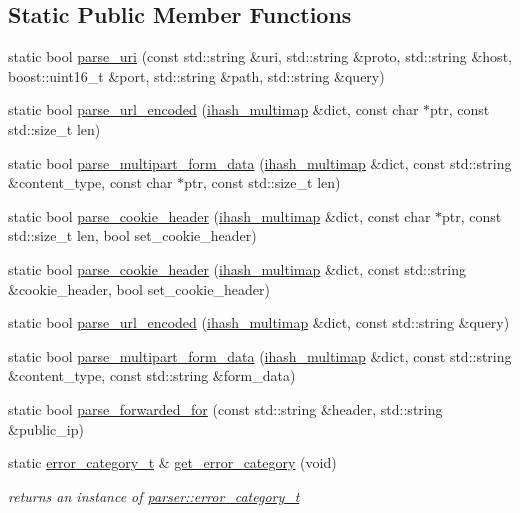 \subsection*{Static Public Member Functions}
\begin{DoxyCompactItemize}
\item 
static bool \hyperlink{classpion_1_1http_1_1parser_a0688e577644445e854e6e9c1d614fd25}{parse\-\_\-uri} (const std\-::string \&uri, std\-::string \&proto, std\-::string \&host, boost\-::uint16\-\_\-t \&port, std\-::string \&path, std\-::string \&query)
\item 
static bool \hyperlink{classpion_1_1http_1_1parser_a3cda26a67405acd5ba04ee19bca52ea7}{parse\-\_\-url\-\_\-encoded} (\hyperlink{namespacepion_a2cd31d7bbe0e98008bd4e6f135103c0e}{ihash\-\_\-multimap} \&dict, const char $\ast$ptr, const std\-::size\-\_\-t len)
\item 
static bool \hyperlink{classpion_1_1http_1_1parser_aa297a0f51bb5a605fb99f188066d9e15}{parse\-\_\-multipart\-\_\-form\-\_\-data} (\hyperlink{namespacepion_a2cd31d7bbe0e98008bd4e6f135103c0e}{ihash\-\_\-multimap} \&dict, const std\-::string \&content\-\_\-type, const char $\ast$ptr, const std\-::size\-\_\-t len)
\item 
static bool \hyperlink{classpion_1_1http_1_1parser_af9a9744b9376e79d4cc05d8c37533bec}{parse\-\_\-cookie\-\_\-header} (\hyperlink{namespacepion_a2cd31d7bbe0e98008bd4e6f135103c0e}{ihash\-\_\-multimap} \&dict, const char $\ast$ptr, const std\-::size\-\_\-t len, bool set\-\_\-cookie\-\_\-header)
\item 
static bool \hyperlink{classpion_1_1http_1_1parser_aaf57ebb2c31ecb126d5c4b2aba305417}{parse\-\_\-cookie\-\_\-header} (\hyperlink{namespacepion_a2cd31d7bbe0e98008bd4e6f135103c0e}{ihash\-\_\-multimap} \&dict, const std\-::string \&cookie\-\_\-header, bool set\-\_\-cookie\-\_\-header)
\item 
static bool \hyperlink{classpion_1_1http_1_1parser_a988623311585ce6097c90586f5711ee0}{parse\-\_\-url\-\_\-encoded} (\hyperlink{namespacepion_a2cd31d7bbe0e98008bd4e6f135103c0e}{ihash\-\_\-multimap} \&dict, const std\-::string \&query)
\item 
static bool \hyperlink{classpion_1_1http_1_1parser_a456501e5a0e9b83fb3c030b003b60676}{parse\-\_\-multipart\-\_\-form\-\_\-data} (\hyperlink{namespacepion_a2cd31d7bbe0e98008bd4e6f135103c0e}{ihash\-\_\-multimap} \&dict, const std\-::string \&content\-\_\-type, const std\-::string \&form\-\_\-data)
\item 
static bool \hyperlink{classpion_1_1http_1_1parser_ab8bd069a0ae8fb51fb8ec6c3d02c065b}{parse\-\_\-forwarded\-\_\-for} (const std\-::string \&header, std\-::string \&public\-\_\-ip)
\item 
static \hyperlink{classpion_1_1http_1_1parser_1_1error__category__t}{error\-\_\-category\-\_\-t} \& \hyperlink{classpion_1_1http_1_1parser_a9313aa230ae4af4c30702c0605a1f701}{get\-\_\-error\-\_\-category} (void)
\begin{DoxyCompactList}\small\item\em returns an instance of \hyperlink{classpion_1_1http_1_1parser_1_1error__category__t}{parser\-::error\-\_\-category\-\_\-t} \end{DoxyCompactList}\end{DoxyCompactItemize}
